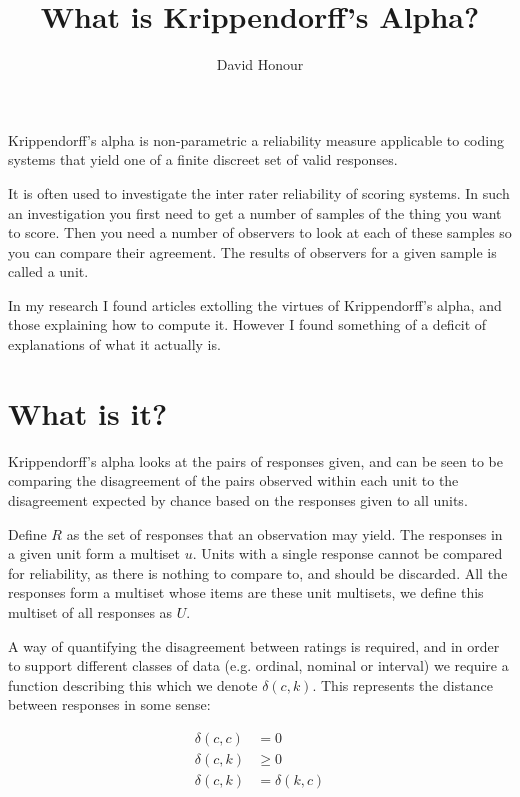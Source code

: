 \documentclass{article}
\title{What is Krippendorff's Alpha?}
\author{David Honour}
\begin{document}
\maketitle

Krippendorff's alpha is non-parametric a reliability measure applicable to
coding systems that yield one of a finite discreet set of valid responses.

It is often used to investigate the inter rater reliability of scoring systems.
In such an investigation you first need to get a number of samples of the thing
you want to score. Then you need a number of observers to look at each of these
samples so you can compare their agreement. The results of observers for a
given sample is called a unit.

In my research I found articles extolling the virtues of Krippendorff's
alpha\cite{hayes2007answering}, and those explaining how to compute
it\cite{krippendorff2007computing}.
However I found something of a deficit of explanations of what it actually is.

\section*{What is it?}
Krippendorff's alpha looks at the pairs of responses given, and can be seen to
be comparing the disagreement of the pairs observed within each unit to the
disagreement expected by chance based on the responses given to all units.

Define $R$ as the set of responses that an observation may yield.
The responses in a given unit form a multiset $u$.
Units with a single response cannot be compared for reliability, as there is
nothing to compare to, and should be discarded.
All the responses form a multiset whose items are these unit multisets, we
define this multiset of all responses as $U$.

A way of quantifying the disagreement between ratings is required, and in order
to support different classes of data (e.g. ordinal, nominal or interval) we
require a function describing this which we denote $\delta(c, k)$.
This represents the distance between responses in some sense:

\begin{align}
\delta(c, c) &= 0 \label{delta_0} \\
\delta(c, k) &\ge 0 \\
\delta(c, k) &= \delta(k, c)
\end{align}

\newcommand{\sumpairs}{\sum_{c \in R} \sum_{k \in R}}
\end{document}
